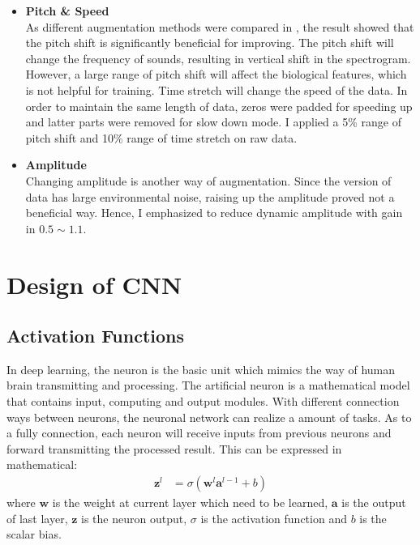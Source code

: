 \begin{itemize}[leftmargin=*]
\item\textbf{Pitch \& Speed}\\
As different augmentation methods were compared in \cite{schluter2015exploring}, the result showed that the pitch shift is significantly beneficial for improving. The pitch shift will change the frequency of sounds, resulting in vertical shift in the spectrogram. However, a large range of pitch shift will affect the biological features, which is not helpful for training. Time stretch will change the speed of the data. In order to maintain the same length of data, zeros were padded for speeding up and latter parts were removed for slow down mode. I applied a 5\% range of pitch shift and 10\% range of time stretch on raw data.
\item\textbf{Amplitude}\\
Changing amplitude is another way of augmentation. Since the version of data has large environmental noise, raising up the amplitude proved not a beneficial way. Hence, I emphasized to reduce dynamic amplitude with gain in $0.5\sim1.1$. 
\end{itemize}

\section{Design of CNN}
\subsection{Activation Functions}
In deep learning, the neuron is the basic unit which mimics the way of human brain transmitting and processing. The artificial neuron is a mathematical model that contains input, computing and output modules. With different connection ways between neurons, the neuronal network can realize a amount of tasks. As to a fully connection, each neuron will receive inputs from previous neurons and forward transmitting the processed result. This can be expressed in mathematical:
\begin{align}
\mathbf z^l &=\sigma(\mathbf w^l \mathbf a^{l-1}+b)
\end{align}
where $\mathbf w$ is the weight at current layer which need to be learned, $\mathbf a$ is the output of last layer, $\mathbf z$ is the neuron output, $\sigma$ is the activation function and $b$ is the scalar bias.

